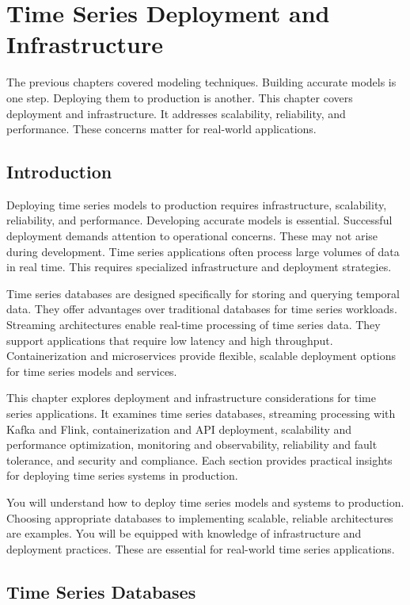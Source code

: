 \chapter{Time Series Deployment and Infrastructure}

The previous chapters covered modeling techniques. Building accurate models is one step. Deploying them to production is another. This chapter covers deployment and infrastructure. It addresses scalability, reliability, and performance. These concerns matter for real-world applications.

\section{Introduction}

Deploying time series models to production requires infrastructure, scalability, reliability, and performance. Developing accurate models is essential. Successful deployment demands attention to operational concerns. These may not arise during development. Time series applications often process large volumes of data in real time. This requires specialized infrastructure and deployment strategies.

Time series databases are designed specifically for storing and querying temporal data. They offer advantages over traditional databases for time series workloads. Streaming architectures enable real-time processing of time series data. They support applications that require low latency and high throughput. Containerization and microservices provide flexible, scalable deployment options for time series models and services.

This chapter explores deployment and infrastructure considerations for time series applications. It examines time series databases, streaming processing with Kafka and Flink, containerization and API deployment, scalability and performance optimization, monitoring and observability, reliability and fault tolerance, and security and compliance. Each section provides practical insights for deploying time series systems in production.

You will understand how to deploy time series models and systems to production. Choosing appropriate databases to implementing scalable, reliable architectures are examples. You will be equipped with knowledge of infrastructure and deployment practices. These are essential for real-world time series applications.

\section{Time Series Databases}

